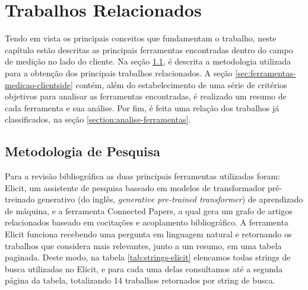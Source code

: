 \documentclass[12pt]{tcc}
\begin{document}
\chapter{Trabalhos Relacionados}
	\label{cap:metodologiatrabsrelacionados}

	\par Tendo em vista os principais conceitos que fundamentam o trabalho, neste capítulo estão descritas as principais ferramentas encontradas dentro do campo de medição no lado do cliente. Na seção \ref{section:metodologia-de-pesquisa}, é descrita a metodologia utilizada para a obtenção dos principais trabalhos relacionados. A seção \ref{sec:ferramentas-medicao-clientside} contém, além do estabelecimento de uma série de critérios objetivos para analisar as ferramentas encontradas, é realizado um resumo de cada ferramenta e sua análise. Por fim, é feita uma relação dos trabalhos já classificados, na seção \ref{section:analise-ferramentas}.

	\section{Metodologia de Pesquisa}
	\label{section:metodologia-de-pesquisa}

	Para a revisão bibliográfica as duas principais ferramentas utilizadas foram: Elicit, um assistente de pesquisa baseado em modelos de transformador pré-treinado generativo (do inglês, \emph{generative pre-trained transformer}) de aprendizado de máquina, e a ferramenta Connected Papers, a qual  gera um grafo de artigos relacionados baseado em cocitações e acoplamento bibliográfico.
	A ferramenta Elicit funciona recebendo uma pergunta em linguagem natural e retornando os trabalhos que considera mais relevantes, junto a um resumo, em uma tabela paginada.
	Deste modo, na tabela \ref{tab:strings-elicit} elencamos todas strings de busca utilizadas no Elicit, e para cada uma delas consultamos até a segunda página da tabela, totalizando 14 trabalhos retornados por string de busca.
\end{document}
